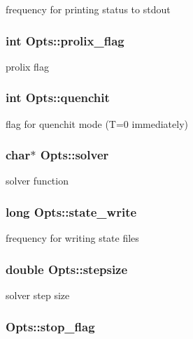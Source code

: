 \label{structOpts_aeebb3ff1e19473c5bb4a1b94132e9122}
frequency for printing status to stdout \hypertarget{structOpts_a259229609e2fabbe5afa91e93d2fc03b}{
\subsubsection[{prolix\_\-flag}]{\setlength{\rightskip}{0pt plus 5cm}int {\bf Opts::prolix\_\-flag}}}
\label{structOpts_a259229609e2fabbe5afa91e93d2fc03b}
prolix flag \hypertarget{structOpts_ac7fcc1b8cfc84f1e0b8d68fd73e81e37}{
\subsubsection[{quenchit}]{\setlength{\rightskip}{0pt plus 5cm}int {\bf Opts::quenchit}}}
\label{structOpts_ac7fcc1b8cfc84f1e0b8d68fd73e81e37}
flag for quenchit mode (T=0 immediately) \hypertarget{structOpts_a5b1e7650a6cf1b1b4175c1d9b184b6e7}{
\subsubsection[{solver}]{\setlength{\rightskip}{0pt plus 5cm}char$\ast$ {\bf Opts::solver}}}
\label{structOpts_a5b1e7650a6cf1b1b4175c1d9b184b6e7}
solver function \hypertarget{structOpts_afa529855a6022f4a55aaac3e4ad2d9be}{
\subsubsection[{state\_\-write}]{\setlength{\rightskip}{0pt plus 5cm}long {\bf Opts::state\_\-write}}}
\label{structOpts_afa529855a6022f4a55aaac3e4ad2d9be}
frequency for writing state files \hypertarget{structOpts_a07ca2da10f7f5172c8e3f2b3f684e72d}{
\subsubsection[{stepsize}]{\setlength{\rightskip}{0pt plus 5cm}double {\bf Opts::stepsize}}}
\label{structOpts_a07ca2da10f7f5172c8e3f2b3f684e72d}
solver step size \hypertarget{structOpts_aa3c1c207619bfefd825aebdc7717fcc2}{
\subsubsection[{stop\_\-flag}]{ {\bf Opts::stop\_\-flag}}}
